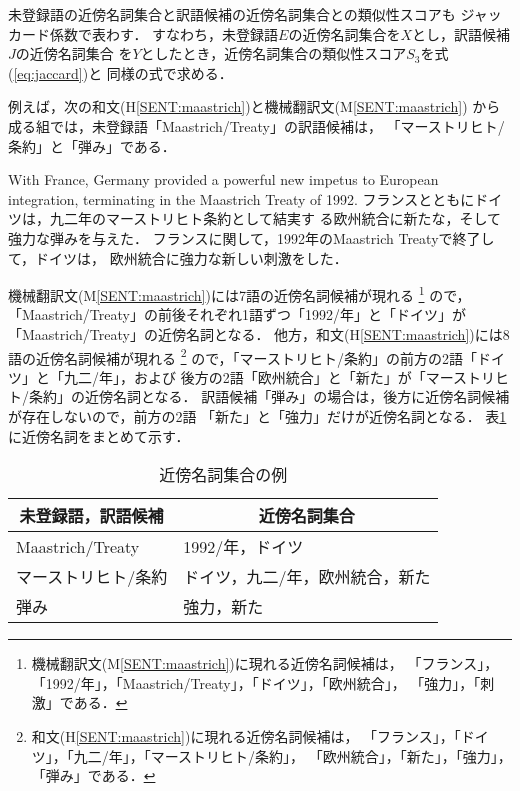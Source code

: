 未登録語の近傍名詞集合と訳語候補の近傍名詞集合との類似性スコアも
ジャッカード係数で表わす．
すなわち，未登録語$E$の近傍名詞集合を$X$とし，訳語候補$J$の近傍名詞集合
を$Y$としたとき，近傍名詞集合の類似性スコア$S_3$を式(\ref{eq:jaccard})と
同様の式で求める．

例えば，次の和文(H\ref{SENT:maastrich})と機械翻訳文(M\ref{SENT:maastrich})
から成る組では，未登録語「Maastrich/Treaty」の訳語候補は，
「マーストリヒト/条約」と「弾み」である．
\begin{SENT2}
\sentE With France, Germany provided a powerful new impetus to European 
integration, terminating in the Maastrich Treaty of 1992.
\sentH フランスとともにドイツは，九二年のマーストリヒト条約として結実す
る欧州統合に新たな，そして強力な弾みを与えた．
\sentM フランスに関して，1992年のMaastrich Treatyで終了して，ドイツは，
欧州統合に強力な新しい刺激をした． 
\label{SENT:maastrich}
\end{SENT2}

機械翻訳文(M\ref{SENT:maastrich})には7語の近傍名詞候補が現れる
\footnote{機械翻訳文(M\ref{SENT:maastrich})に現れる近傍名詞候補は，
「フランス」，「1992/年」，「Maastrich/Treaty」，「ドイツ」，「欧州統合」，
「強力」，「刺激」である．} 
ので，「Maastrich/Treaty」の前後それぞれ1語ずつ「1992/年」と「ドイツ」が
「Maastrich/Treaty」の近傍名詞となる． 
他方，和文(H\ref{SENT:maastrich})には8語の近傍名詞候補が現れる
\footnote{和文(H\ref{SENT:maastrich})に現れる近傍名詞候補は，
「フランス」，「ドイツ」，「九二/年」，「マーストリヒト/条約」，
「欧州統合」，「新た」，「強力」，「弾み」である．} 
ので，「マーストリヒト/条約」の前方の2語「ドイツ」と「九二/年」，および
後方の2語「欧州統合」と「新た」が「マーストリヒト/条約」の近傍名詞となる． 
訳語候補「弾み」の場合は，後方に近傍名詞候補が存在しないので，前方の2語
「新た」と「強力」だけが近傍名詞となる．
表\ref{tab:neighbor}\,に近傍名詞をまとめて示す．
\begin{table}[htbp]
\caption{近傍名詞集合の例}
\label{tab:neighbor}
\begin{center}
\begin{tabular}{|l||l|}\hline
\multicolumn{1}{|c||}{未登録語，訳語候補} & 
\multicolumn{1}{c|}{近傍名詞集合} \\\hline\hline
Maastrich/Treaty    &	1992/年，ドイツ \\
マーストリヒト/条約 &	ドイツ，九二/年，欧州統合，新た \\
弾み		    &	強力，新た \\\hline
\end{tabular}
\end{center}
\end{table}

